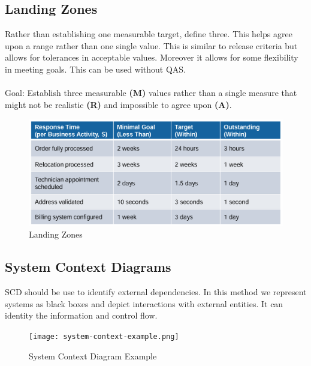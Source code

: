 \documentclass[../Main.tex]{subfiles}
\begin{document}
\subsection{Landing Zones}
Rather than establishing one measurable target, define three.
This helps agree upon a range rather than one single value.
This is similar to release criteria but allows for tolerances
in acceptable values. Moreover it allows for some flexibility
in meeting goals. This can be used without QAS.
\\\\
Goal:  Establish three measurable \textbf{(M)} values rather than a single measure that might not be realistic \textbf{(R)} and
impossible to agree upon \textbf{(A)}.

\begin{figure}[H]
    \centering
    \includegraphics[width=1\linewidth]{Images/landingzone.png}
    \caption{Landing Zones}
\end{figure}

\subsection{System Context Diagrams}
SCD should be use to identify external dependencies.
In this method we represent systems as black boxes and
depict interactions with external entities.
It can identity the information and control flow.

\begin{figure}[H]
    \centering
    \texttt{[image: system-context-example.png]}
    \caption{System Context Diagram Example}
\end{figure}

\end{document}
